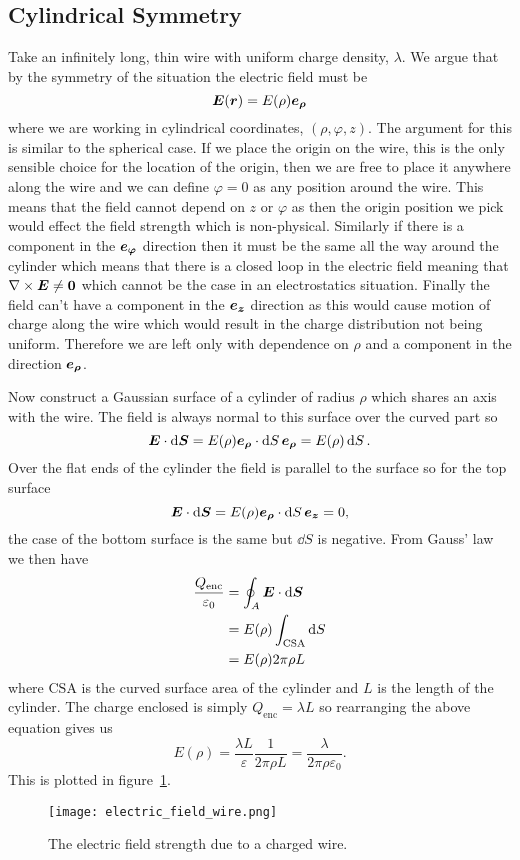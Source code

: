     \subsection{Cylindrical Symmetry}
    Take an infinitely long, thin wire with uniform charge density, \(\lambda\).
    We argue that by the symmetry of the situation the electric field must be
    \[\bm{E}(\bm{r}) = E(\rho)\bm{e_{\rho}}\]
    where we are working in cylindrical coordinates, \((\rho, \varphi, z)\).
    The argument for this is similar to the spherical case.
    If we place the origin on the wire, this is the only sensible choice for the location of the origin, then we are free to place it anywhere along the wire and we can define \(\varphi = 0\) as any position around the wire.
    This means that the field cannot depend on \(z\) or \(\varphi\) as then the origin position we pick would effect the field strength which is non-physical.
    Similarly if there is a component in the \(\bm{e_{\varphi}}\) direction then it must be the same all the way around the cylinder which means that there is a closed loop in the electric field meaning that \(\nabla\times\bm{E} \ne \bm{0}\) which cannot be the case in an electrostatics situation.
    Finally the field can't have a component in the \(\bm{e_{z}}\) direction as this would cause motion of charge along the wire which would result in the charge distribution not being uniform.
    Therefore we are left only with dependence on \(\rho\) and a component in the direction \(\bm{e_{\rho}}\).
    
    Now construct a Gaussian surface of a cylinder of radius \(\rho\) which shares an axis with the wire.
    The field is always normal to this surface over the curved part so
    \[\bm{E}\cdot\dd{\bm{S}} = E(\rho)\bm{e_{\rho}}\cdot\dd{S}\bm{e_{\rho}} = E(\rho)\dd{S}.\]
    Over the flat ends of the cylinder the field is parallel to the surface so for the top surface
    \[\bm{E}\cdot\dd{\bm{S}} = E(\rho)\bm{e_{\rho}}\cdot\dd{S}\bm{e_{z}} = 0,\]
    the case of the bottom surface is the same but \(\dd{S}\) is negative.
    From Gauss' law we then have
    \begin{align*}
        \frac{Q_\mathrm{enc}}{\varepsilon_0} &= \oint_A \bm{E}\cdot\dd{\bm{S}}\\
        &= E(\rho)\int_{\mathrm{CSA}}\dd{S}\\
        &= E(\rho)2\pi\rho L
    \end{align*}
    where \(\mathrm{CSA}\) is the curved surface area of the cylinder and \(L\) is the length of the cylinder.
    The charge enclosed is simply \(Q_\mathrm{enc} = \lambda L\) so rearranging the above equation gives us
    \[E(\rho) = \frac{\lambda L}{\varepsilon}\frac{1}{2\pi\rho L} = \frac{\lambda}{2\pi\rho\varepsilon_0}.\]
    This is plotted in figure~\ref{fig:electric field strength of a charged wire}.
    \begin{figure}[ht]
        \centering
        \texttt{[image: electric\_field\_wire.png]}
        \caption{The electric field strength due to a charged wire.}
        \label{fig:electric field strength of a charged wire}
    \end{figure}
    
